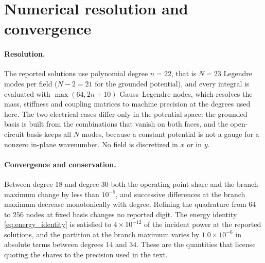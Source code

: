 \section{Numerical resolution and convergence}
\label{app:repro}

\paragraph{Resolution.}  The reported solutions use polynomial degree $n=22$, that is
$N=23$ Legendre modes per field ($N-2=21$ for the grounded potential), and every integral is evaluated
with $\max(64,2n+10)$ Gauss--Legendre nodes, which resolves the mass, stiffness
and coupling matrices to machine precision at the degrees used here.  The two
electrical cases differ only in the potential space: the grounded basis is built
from the combinations that vanish on both faces, and the open-circuit basis
keeps all $N$ modes, because a constant potential is not a gauge for a nonzero in-plane wavenumber.  No field is discretized in $x$ or in $y$.

\paragraph{Convergence and conservation.}  Between degree $18$ and degree $30$
both the operating-point share and the branch maximum change by less than
$10^{-5}$, and successive differences at the branch maximum decrease
monotonically with degree.  Refining the quadrature from $64$ to $256$ nodes at
fixed basis changes no reported digit.  The energy identity
\eqref{eq:energy_identity} is satisfied to $4\times10^{-12}$ of the incident
power at the reported solutions, and the partition at the branch maximum varies by $1.0\times10^{-6}$ in absolute terms between
degrees $14$ and $34$.  These are the quantities that
license quoting the shares to the precision used in the text.
